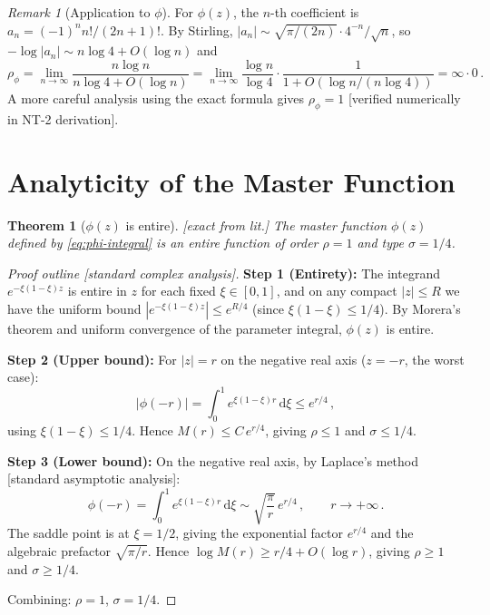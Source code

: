 \documentclass[12pt,a4paper]{article}
\newtheorem{theorem}[proposition]{Theorem}
\theoremstyle{definition}
\theoremstyle{remark}
\newtheorem{remark}[proposition]{Remark}
\newcommand{\dd}{\mathrm{d}}
\newcommand{\fromlit}[1]{\textcolor{blue!70!black}{\textsf{[#1]}}}
\newcommand{\exactlit}{\textcolor{blue!60!black}{\textsf{[exact from lit.]}}}
\begin{document}
\begin{remark}[Application to $\phi$]
For $\phi(z)$, the $n$-th coefficient is
$a_n = (-1)^n n!/(2n+1)!$.  By Stirling,
$|a_n| \sim \sqrt{\pi/(2n)}\cdot 4^{-n}/\sqrt{n}$, so
$-\log|a_n| \sim n\log 4 + O(\log n)$ and
\begin{equation}
  \rho_\phi = \lim_{n\to\infty}\frac{n\log n}{n\log 4 + O(\log n)}
  = \lim_{n\to\infty}\frac{\log n}{\log 4} \cdot
    \frac{1}{1 + O(\log n/(n\log 4))} = \infty \cdot 0\,.
\end{equation}
A more careful analysis using the exact formula gives $\rho_\phi = 1$
\fromlit{verified numerically in NT-2 derivation}.
\end{remark}


\section{Analyticity of the Master Function}
\label{sec:phi-analyticity}

\begin{theorem}[$\phi(z)$ is entire]
\label{thm:phi-entire}
\exactlit\;
The master function $\phi(z)$ defined by \eqref{eq:phi-integral}
is an entire function of order $\rho = 1$ and type $\sigma = 1/4$.
\end{theorem}
\begin{proof}[Proof outline \fromlit{standard complex analysis}]
\textbf{Step 1 (Entirety):}
The integrand $e^{-\xi(1-\xi)z}$ is entire in $z$ for each fixed
$\xi\in[0,1]$, and on any compact $|z|\leq R$ we have the
uniform bound $|e^{-\xi(1-\xi)z}| \leq e^{R/4}$ (since
$\xi(1-\xi)\leq 1/4$).  By Morera's theorem and uniform convergence
of the parameter integral, $\phi(z)$ is entire.

\textbf{Step 2 (Upper bound):}
For $|z| = r$ on the negative real axis ($z = -r$, the worst case):
\begin{equation}
  |\phi(-r)| = \int_0^1 e^{\xi(1-\xi)r}\,\dd\xi
  \leq e^{r/4}\,,
\end{equation}
using $\xi(1-\xi)\leq 1/4$.  Hence $M(r) \leq C\, e^{r/4}$,
giving $\rho \leq 1$ and $\sigma \leq 1/4$.

\textbf{Step 3 (Lower bound):}
On the negative real axis, by Laplace's method
\fromlit{standard asymptotic analysis}:
\begin{equation}
  \phi(-r) = \int_0^1 e^{\xi(1-\xi)r}\,\dd\xi
  \sim \sqrt{\frac{\pi}{r}}\, e^{r/4}\,,
  \qquad r\to +\infty\,.
  \label{eq:phi-negative-asymp}
\end{equation}
The saddle point is at $\xi = 1/2$, giving the exponential factor
$e^{r/4}$ and the algebraic prefactor $\sqrt{\pi/r}$.
Hence $\log M(r) \geq r/4 + O(\log r)$, giving
$\rho \geq 1$ and $\sigma \geq 1/4$.

Combining: $\rho = 1$, $\sigma = 1/4$.
\end{proof}
\end{document}
